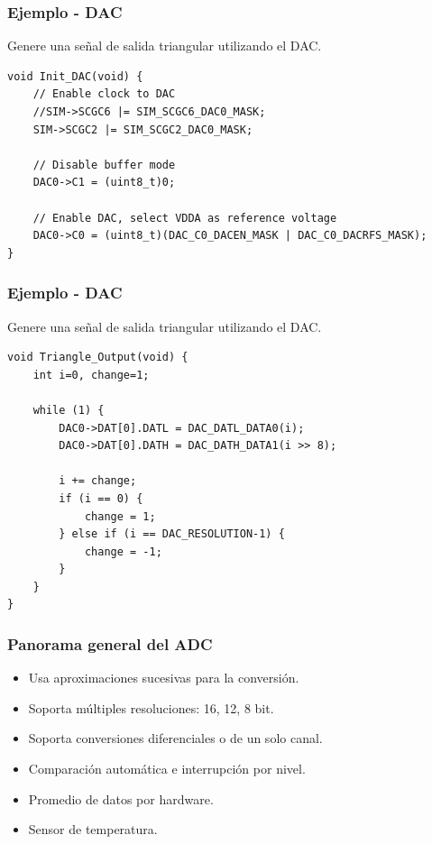\documentclass[10.5pt,scale=1.0,t,aspectratio=169,hyperref={pdfpagelabels=false}]{beamer}
\begin{document}
\begin{frame}[fragile]
	\frametitle{Ejemplo - DAC}
	{\small
		Genere una señal de salida triangular utilizando el DAC.
		\begin{lstlisting}[style=CStyle]
void Init_DAC(void) {
	// Enable clock to DAC
	//SIM->SCGC6 |= SIM_SCGC6_DAC0_MASK;
	SIM->SCGC2 |= SIM_SCGC2_DAC0_MASK;
	
	// Disable buffer mode
	DAC0->C1 = (uint8_t)0;
	
	// Enable DAC, select VDDA as reference voltage
	DAC0->C0 = (uint8_t)(DAC_C0_DACEN_MASK | DAC_C0_DACRFS_MASK);
}
		\end{lstlisting}
	}
\end{frame}
\begin{frame}[fragile]
	\frametitle{Ejemplo - DAC}
	{\small
		Genere una señal de salida triangular utilizando el DAC.
		\begin{lstlisting}[style=CStyle]
void Triangle_Output(void) {
	int i=0, change=1;
	
	while (1) {
		DAC0->DAT[0].DATL = DAC_DATL_DATA0(i);
		DAC0->DAT[0].DATH = DAC_DATH_DATA1(i >> 8);
		
		i += change;
		if (i == 0) {
			change = 1;
		} else if (i == DAC_RESOLUTION-1) {
			change = -1;
		}
	}
}
		\end{lstlisting}
	}
\end{frame}
\begin{frame}[fragile]
	\frametitle{Panorama general del ADC}
	{\small
		\begin{itemize}
			\item Usa aproximaciones sucesivas para la conversión.
			\item Soporta múltiples resoluciones: 16, 12, 8 bit. 
			\item Soporta conversiones diferenciales o de un solo canal.
			\item Comparación automática e interrupción por nivel.
			\item Promedio de datos por hardware.
			\item Sensor de temperatura.
		\end{itemize}
	}
\end{frame}
\end{document}
